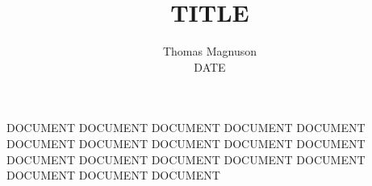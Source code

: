 \documentclass[12pt]{amsart}
\title{TITLE}
\author{Thomas Magnuson\\ DATE}
\begin{document}
 	\maketitle
 	\setlength{\parindent}{1.29cm}
DOCUMENT DOCUMENT DOCUMENT DOCUMENT DOCUMENT DOCUMENT DOCUMENT DOCUMENT DOCUMENT DOCUMENT DOCUMENT DOCUMENT DOCUMENT DOCUMENT DOCUMENT DOCUMENT DOCUMENT DOCUMENT
\end{document}
